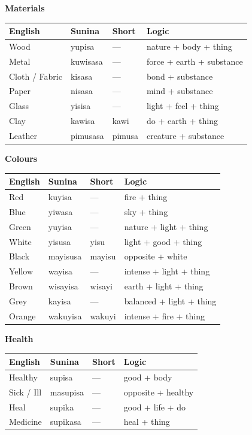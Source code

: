 \documentclass[12pt, a4paper]{article}
\begin{document}
\medskip
\noindent\textbf{Materials}
\begin{tabular}{@{}llll@{}}
\toprule
\textbf{English} & \textbf{Sunina} & \textbf{Short} & \textbf{Logic} \\ \midrule
Wood & yupisa & --- & nature + body + thing \\
Metal & kuwisasa & --- & force + earth + substance \\
Cloth / Fabric & kisasa & --- & bond + substance \\
Paper & nisasa & --- & mind + substance \\
Glass & yisisa & --- & light + feel + thing \\
Clay & kawisa & kawi & do + earth + thing \\
Leather & pimusasa & pimusa & creature + substance \\
\bottomrule
\end{tabular}

\medskip
\noindent\textbf{Colours}
\begin{tabular}{@{}llll@{}}
\toprule
\textbf{English} & \textbf{Sunina} & \textbf{Short} & \textbf{Logic} \\ \midrule
Red & kuyisa & --- & fire + thing \\
Blue & yiwasa & --- & sky + thing \\
Green & yuyisa & --- & nature + light + thing \\
White & yisusa & yisu & light + good + thing \\
Black & mayisusa & mayisu & opposite + white \\
Yellow & wayisa & --- & intense + light + thing \\
Brown & wisayisa & wisayi & earth + light + thing \\
Grey & kayisa & --- & balanced + light + thing \\
Orange & wakuyisa & wakuyi & intense + fire + thing \\
\bottomrule
\end{tabular}

\medskip
\noindent\textbf{Health}
\begin{tabular}{@{}llll@{}}
\toprule
\textbf{English} & \textbf{Sunina} & \textbf{Short} & \textbf{Logic} \\ \midrule
Healthy & supisa & --- & good + body \\
Sick / Ill & masupisa & --- & opposite + healthy \\
Heal & supika & --- & good + life + do \\
Medicine & supikasa & --- & heal + thing \\
\bottomrule
\end{tabular}
\end{document}
